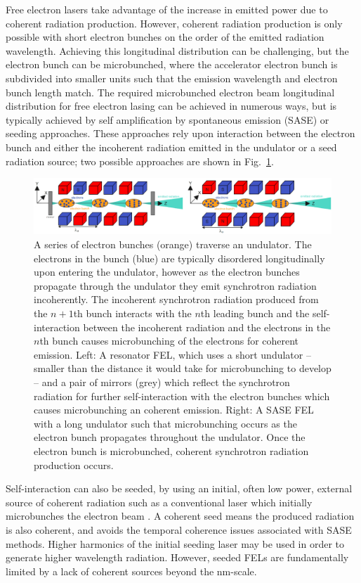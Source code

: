 \documentclass[../main.tex]{subfiles}
\begin{document}
Free electron lasers take advantage of the increase in emitted power due to coherent radiation production. However, coherent radiation production is only possible with short electron bunches on the order of the emitted radiation wavelength. Achieving this longitudinal distribution can be challenging, but the electron bunch can be microbunched, where the accelerator electron bunch is subdivided into smaller units such that the emission wavelength and electron bunch length match. The required microbunched electron beam longitudinal distribution for free electron lasing can be achieved in numerous ways, but is typically achieved by self amplification by spontaneous emission (SASE) or seeding approaches. These approaches rely upon interaction between the electron bunch and either the incoherent radiation emitted in the undulator or a seed radiation source; two possible approaches are shown in Fig.~\ref{fig:FEL_microbunching}.
\begin{figure}[!h]
\centering
\includegraphics[width=\textwidth]{Figures/Introduction/FELs_microbunching.pdf}
\caption{A series of electron bunches (orange) traverse an undulator. The electrons in the bunch (blue) are typically disordered longitudinally upon entering the undulator, however as the electron bunches propagate through the undulator they emit synchrotron radiation incoherently. The incoherent synchrotron radiation produced from the $n+1$th bunch interacts with the $n$th leading bunch and the self-interaction between the incoherent radiation and the electrons in the $n$th bunch causes microbunching of the electrons for coherent emission. Left: A resonator FEL, which uses a short undulator -- smaller than the distance it would take for microbunching to develop -- and a pair of mirrors (grey) which reflect the synchrotron radiation for further self-interaction with the electron bunches which causes microbunching an coherent emission. Right: A SASE FEL with a long undulator such that microbunching occurs as the electron bunch propagates throughout the undulator. Once the electron bunch is microbunched, coherent synchrotron radiation production occurs. }
\label{fig:FEL_microbunching}
\end{figure}

Self-interaction can also be seeded, by using an initial, often low power, external source of coherent radiation such as a conventional laser which initially microbunches the electron beam \cite{allaria2012highly}. A coherent seed means the produced radiation is also coherent, and avoids the temporal coherence issues associated with SASE methods. Higher harmonics of the initial seeding laser may be used in order to generate higher wavelength radiation. However, seeded FELs are fundamentally limited by a lack of coherent sources beyond the \si{\nano\meter}-scale.
\end{document}
